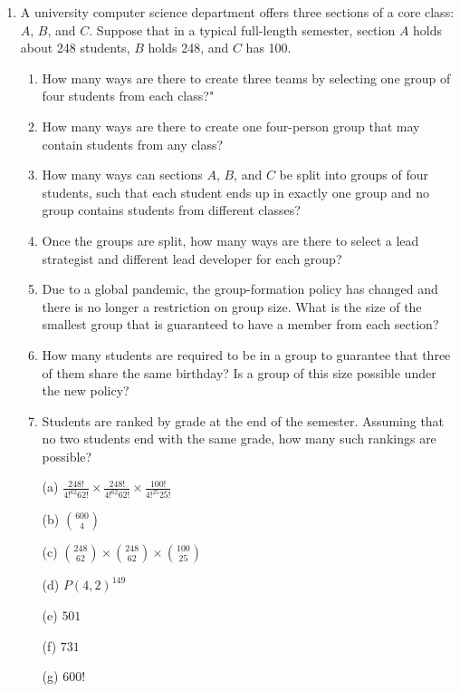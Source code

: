 \begin{enumerate}
\item A university computer science department offers three sections of a core class: $A$, $B$, and $C$. Suppose that in a typical full-length semester, section $A$ holds about 248 students, $B$ holds 248, and $C$ has 100. 
\begin{enumerate}
    \item How many ways are there to create three teams by selecting one group of four students from each class?"
    \item How many ways are there to create one four-person group that may contain students from any class?
    \item How many ways can sections $A$, $B$, and $C$ be split into groups of four students, such that each student ends up in exactly one group and no group contains students from different classes?
    \item Once the groups are split, how many ways are there to select a lead strategist and different lead developer for each group?
    \item Due to a global pandemic, the group-formation policy has changed and there is no longer a restriction on group size. What is the size of the smallest group that is guaranteed to have a member from each section?
    \item How many students are required to be in a group to guarantee that three of them share the same birthday? Is a group of this size possible under the new policy?
    \item Students are ranked by grade at the end of the semester. Assuming that no two students end with the same grade, how many such rankings are possible?
\end{enumerate}

\begin{solution}
\begin{enumerate}
    \item[(a)] $\frac{248!}{4!^{62}62!} \times \frac{248!}{4!^{62}62!} \times \frac{100!}{4!^{25}25!}$
    \item[(b)] ${600 \choose 4}$
    \item[(c)] ${248 \choose 62} \times {248 \choose 62} \times {100 \choose 25}$
    \item[(d)] $P(4,2)^{149}$
    \item[(e)] $501$
    \item[(f)] $731$
    \item[(g)] $600!$
\end{enumerate}
\end{solution}



\end{enumerate}
